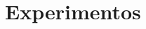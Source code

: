 \documentclass[lang=pt,11pt]{elegantbook}
\begin{document}
%
%
%
%
%

\chapter{Experimentos}
\end{document}
